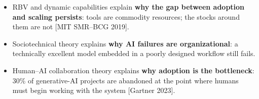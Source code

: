 \begin{itemize}
  \item RBV and dynamic capabilities explain \textbf{why the gap between
        adoption and scaling persists}: tools are commodity resources; the
        stocks around them are not [MIT SMR--BCG 2019].
  \item Sociotechnical theory explains \textbf{why AI failures are
        organizational}: a technically excellent model embedded in a
        poorly designed workflow still fails.
  \item Human--AI collaboration theory explains \textbf{why adoption is the
        bottleneck}: 30\% of generative-AI projects are abandoned at the
        point where humans must begin working with the system [Gartner 2023].
\end{itemize}

